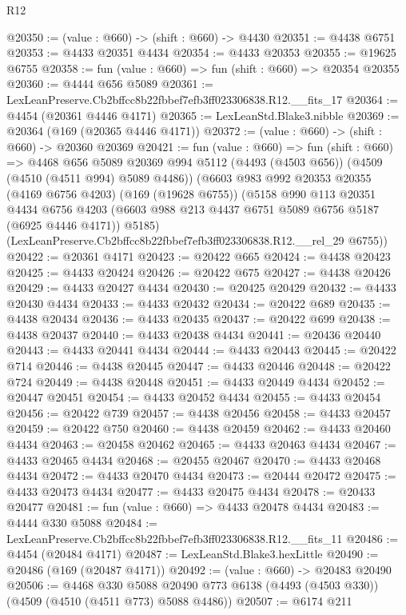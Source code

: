 \begin{lexlean}{R12}
\begin{coremodule}
@20350 := (value : @660) -> (shift : @660) -> @4430
@20351 := @4438 @6751
@20353 := @4433 @20351 @4434
@20354 := @4433 @20353
@20355 := @19625 @6755
@20358 := fun (value : @660) => fun (shift : @660) => @20354 @20355
@20360 := @4444 @656 @5089
@20361 := LexLeanPreserve.Cb2bffcc8b22fbbef7efb3ff023306838.R12.__fits_17
@20364 := @4454 (@20361 @4446 @4171)
@20365 := LexLeanStd.Blake3.nibble
@20369 := @20364 (@169 (@20365 @4446 @4171))
@20372 := (value : @660) -> (shift : @660) -> @20360 @20369
@20421 := fun (value : @660) =>
  fun (shift : @660) =>
  @4468
    @656
    @5089
    @20369
    @994
    @5112
    (@4493 (@4503 @656))
    (@4509 (@4510 (@4511 @994) @5089 @4486))
    (@6603
      @983
      @992
      @20353
      @20355
      (@4169 @6756 @4203)
      (@169 (@19628 @6755))
      (@5158
        @990
        @113
        @20351
        @4434
        @6756
        @4203
        (@6603 @988 @213 @4437 @6751 @5089 @6756 @5187 (@6925 @4446 @4171))
        @5185)
      (LexLeanPreserve.Cb2bffcc8b22fbbef7efb3ff023306838.R12.__rel_29 @6755))
@20422 := @20361 @4171
@20423 := @20422 @665
@20424 := @4438 @20423
@20425 := @4433 @20424
@20426 := @20422 @675
@20427 := @4438 @20426
@20429 := @4433 @20427 @4434
@20430 := @20425 @20429
@20432 := @4433 @20430 @4434
@20433 := @4433 @20432
@20434 := @20422 @689
@20435 := @4438 @20434
@20436 := @4433 @20435
@20437 := @20422 @699
@20438 := @4438 @20437
@20440 := @4433 @20438 @4434
@20441 := @20436 @20440
@20443 := @4433 @20441 @4434
@20444 := @4433 @20443
@20445 := @20422 @714
@20446 := @4438 @20445
@20447 := @4433 @20446
@20448 := @20422 @724
@20449 := @4438 @20448
@20451 := @4433 @20449 @4434
@20452 := @20447 @20451
@20454 := @4433 @20452 @4434
@20455 := @4433 @20454
@20456 := @20422 @739
@20457 := @4438 @20456
@20458 := @4433 @20457
@20459 := @20422 @750
@20460 := @4438 @20459
@20462 := @4433 @20460 @4434
@20463 := @20458 @20462
@20465 := @4433 @20463 @4434
@20467 := @4433 @20465 @4434
@20468 := @20455 @20467
@20470 := @4433 @20468 @4434
@20472 := @4433 @20470 @4434
@20473 := @20444 @20472
@20475 := @4433 @20473 @4434
@20477 := @4433 @20475 @4434
@20478 := @20433 @20477
@20481 := fun (value : @660) => @4433 @20478 @4434
@20483 := @4444 @330 @5088
@20484 := LexLeanPreserve.Cb2bffcc8b22fbbef7efb3ff023306838.R12.__fits_11
@20486 := @4454 (@20484 @4171)
@20487 := LexLeanStd.Blake3.hexLittle
@20490 := @20486 (@169 (@20487 @4171))
@20492 := (value : @660) -> @20483 @20490
@20506 := @4468
    @330
    @5088
    @20490
    @773
    @6138
    (@4493 (@4503 @330))
    (@4509 (@4510 (@4511 @773) @5088 @4486))
@20507 := @6174 @211

\end{coremodule}
\end{lexlean}
